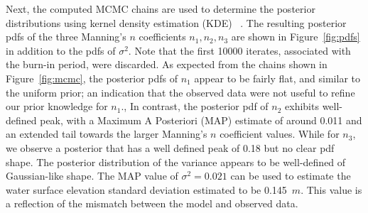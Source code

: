 Next, the computed MCMC chains are used to determine the posterior 
distributions using kernel density estimation (KDE)
~\citep{Parzen1962,Silverman1986}.  The resulting posterior pdfs 
of the three Manning's $n$ coefficients $n_1,n_2,n_3$ are shown 
in Figure~\ref{fig:pdfs} in addition to the pdfs of $\sigma^2$. 
Note that the first 10000 iterates, associated with the burn-in period, were discarded.  
As expected from the chains shown in Figure~\ref{fig:mcmc}, the posterior pdfs of $n_1$ appear to be fairly flat, 
and similar to the uniform prior; an indication that 
the observed data were not useful to refine our prior knowledge for $n_1$.,
In contrast, the posterior pdf of $n_2$ exhibits well-defined peak, 
with a Maximum A Posteriori (MAP) estimate of around 0.011
and an extended tail towards the larger Manning's $n$ coefficient values.
While for $n_3$, we observe a posterior that has a well defined peak
of 0.18 but no clear pdf shape. The posterior distribution of the variance 
appears to be well-defined of Gaussian-like shape. 
The MAP value of $\sigma^2=0.021$ can be used to estimate the water surface elevation standard 
deviation estimated to be 0.145~$m$. 
This value is a reflection of the mismatch between the model and 
observed data.





